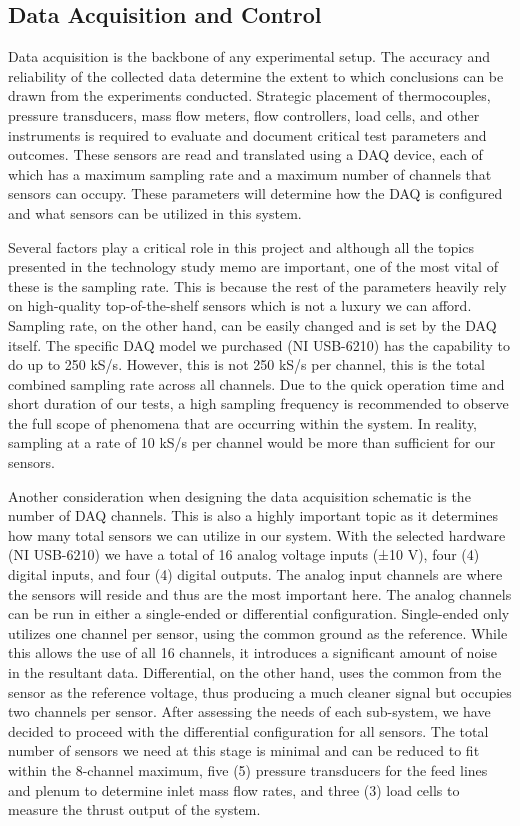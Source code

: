 \subsection{Data Acquisition and Control}

Data acquisition is the backbone of any experimental setup. The accuracy and reliability of the collected data determine the extent to which conclusions can be drawn from the experiments conducted. Strategic placement of thermocouples, pressure transducers, mass flow meters, flow controllers, load cells, and other instruments is required to evaluate and document critical test parameters and outcomes.  These sensors are read and translated using a DAQ device, each of which has a maximum sampling rate and a maximum number of channels that sensors can occupy. These parameters will determine how the DAQ is configured and what sensors can be utilized in this system.

Several factors play a critical role in this project and although all the topics presented in the technology study memo are important, one of the most vital of these is the sampling rate. This is because the rest of the parameters heavily rely on high-quality top-of-the-shelf sensors which is not a luxury we can afford. Sampling rate, on the other hand, can be easily changed and is set by the DAQ itself. The specific DAQ model we purchased (NI USB-6210) has the capability to do up to 250 kS/s. However, this is not 250 kS/s per channel, this is the total combined sampling rate across all channels. Due to the quick operation time and short duration of our tests, a high sampling frequency is recommended to observe the full scope of phenomena that are occurring within the system. In reality, sampling at a rate of 10 kS/s per channel would be more than sufficient for our sensors.

Another consideration when designing the data acquisition schematic is the number of DAQ channels. This is also a highly important topic as it determines how many total sensors we can utilize in our system. With the selected hardware (NI USB-6210) we have a total of 16 analog voltage inputs (±10 V), four (4) digital inputs, and four (4) digital outputs. The analog input channels are where the sensors will reside and thus are the most important here. The analog channels can be run in either a single-ended or differential configuration. Single-ended only utilizes one channel per sensor, using the common ground as the reference. While this allows the use of all 16 channels, it introduces a significant amount of noise in the resultant data. Differential, on the other hand, uses the common from the sensor as the reference voltage, thus producing a much cleaner signal but occupies two channels per sensor. After assessing the needs of each sub-system, we have decided to proceed with the differential configuration for all sensors. The total number of sensors we need at this stage is minimal and can be reduced to fit within the 8-channel maximum, five (5) pressure transducers for the feed lines and plenum to determine inlet mass flow rates, and three (3) load cells to measure the thrust output of the system.

